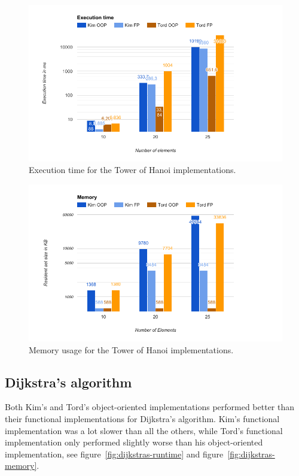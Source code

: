 \documentclass {article}
\begin{document}
\begin{figure}[H]
\centering
\includegraphics[width=\textwidth]{hanoi-runtime}

\caption{Execution time for the Tower of Hanoi implementations.}
\label{fig:hanoi-runtime}
\end{figure}

\begin{figure}[H]
\centering
\includegraphics[width=\textwidth]{hanoi-memory}

\caption{Memory usage for the Tower of Hanoi implementations.}
\label{fig:hanoi-memory}
\end{figure}
\subsection{Dijkstra's algorithm}
Both Kim's and Tord's object-oriented implementations performed better than their functional implementations for Dijkstra's algorithm. Kim's functional implementation was a lot slower than all the others, while Tord's functional implementation only performed slightly worse than his object-oriented implementation, see figure~\ref{fig:dijkstras-runtime} and figure~\ref{fig:dijkstras-memory}. 
\end{document}
